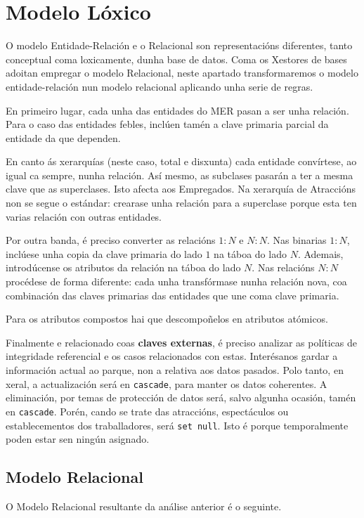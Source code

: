 \documentclass[12pt,a4paper]{book}
\theoremstyle{definition}
\theoremstyle{break}
\begin{document}
\begin{table} [H]
\begin{tabular}{|c|m{3cm}|m{4cm}|m{2cm}|m{0.7cm}|}
		\end{tabular}
	\end{table}
	
	\chapter{Modelo Lóxico}
	O modelo Entidade-Relación e o Relacional son representacións diferentes, tanto conceptual coma loxicamente, dunha base de datos. Coma os Xestores de bases adoitan empregar o modelo Relacional, neste apartado transformaremos o modelo entidade-relación nun modelo relacional aplicando unha serie de regras.
	
	En primeiro lugar, cada unha das entidades do MER pasan a ser unha relación. Para o caso das entidades febles, inclúen tamén a clave primaria parcial da entidade da que dependen.
	
	En canto ás xerarquías (neste caso, total e disxunta) cada entidade convírtese, ao igual ca sempre, nunha relación. Así mesmo, as subclases pasarán a ter a mesma clave que as superclases. Isto afecta aos Empregados. Na xerarquía de Atraccións non se segue o estándar: crearase unha relación para a superclase porque esta ten varias relación con outras entidades. 
	
	Por outra banda, é preciso converter as relacións $1:N$ e $N:N$. Nas binarias $1:N$, inclúese unha copia da clave primaria do lado $1$ na táboa do lado $N$. Ademais, introdúcense os atributos da relación na táboa do lado $N$. Nas relacións $N:N$ procédese de forma diferente: cada unha transfórmase nunha relación nova, coa combinación das claves primarias das entidades que une coma clave primaria.
	
	Para os atributos compostos hai que descompoñelos en atributos atómicos.
	
	Finalmente e relacionado coas \textbf{claves externas}, é preciso analizar as políticas de integridade referencial e os casos relacionados con estas. Interésanos gardar a información actual ao parque, non a relativa aos datos pasados. Polo tanto, en xeral, a actualización será en \texttt{cascade}, para manter os datos coherentes. A eliminación, por temas de protección de datos será, salvo algunha ocasión, tamén en \texttt{cascade}. Porén, cando se trate das atraccións, espectáculos ou establecementos dos traballadores, será \texttt{set null}. Isto é porque temporalmente poden estar sen ningún asignado.
	
	\newpage
	\section{Modelo Relacional}
	O Modelo Relacional resultante da análise anterior é o seguinte.
	
\end{document}
